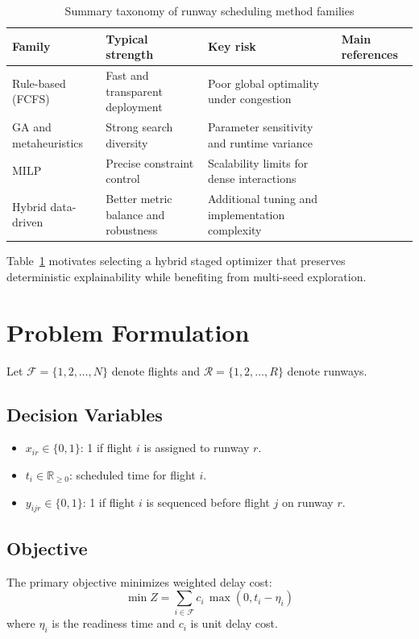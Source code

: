 \documentclass[conference]{IEEEtran}
\begin{document}
\begin{table}[t]
\centering
\caption{Summary taxonomy of runway scheduling method families}
\small
\begin{tabular}{p{1.8cm} p{2.15cm} p{1.6cm} p{1.55cm}}
\toprule
Family & Typical strength & Key risk & Main references \\
\midrule
Rule-based (FCFS) & Fast and transparent deployment & Poor global optimality under congestion & \cite{ref1,ref4} \\
GA and metaheuristics & Strong search diversity & Parameter sensitivity and runtime variance & \cite{ref5,ref6,ref7} \\
MILP & Precise constraint control & Scalability limits for dense interactions & \cite{ref9,ref10,ref11} \\
Hybrid data-driven & Better metric balance and robustness & Additional tuning and implementation complexity & \cite{ref13,ref14,ref15,ref16} \\
\bottomrule
\end{tabular}
\label{tab:litsummary}
\end{table}

Table~\ref{tab:litsummary} motivates selecting a hybrid staged optimizer that preserves deterministic explainability while benefiting from multi-seed exploration.

\section{Problem Formulation}
Let $\mathcal{F}=\{1,2,\ldots,N\}$ denote flights and $\mathcal{R}=\{1,2,\ldots,R\}$ denote runways.

\subsection{Decision Variables}
\begin{itemize}
    \item $x_{ir} \in \{0,1\}$: 1 if flight $i$ is assigned to runway $r$.
    \item $t_i \in \mathbb{R}_{\ge 0}$: scheduled time for flight $i$.
    \item $y_{ijr} \in \{0,1\}$: 1 if flight $i$ is sequenced before flight $j$ on runway $r$.
\end{itemize}

\subsection{Objective}
The primary objective minimizes weighted delay cost:
\begin{equation}
\min Z = \sum_{i\in\mathcal{F}} c_i\,\max(0, t_i-\eta_i)
\label{eq:objective}
\end{equation}
where $\eta_i$ is the readiness time and $c_i$ is unit delay cost.
\end{document}
